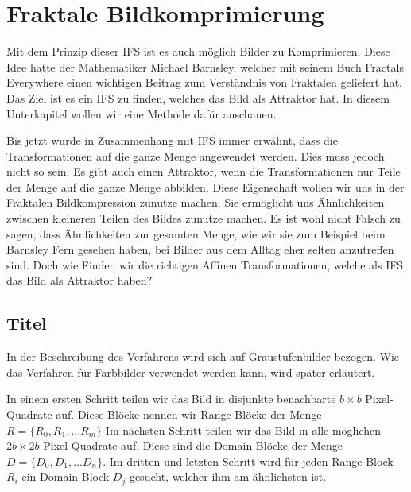 %
%
%
\section{Fraktale Bildkomprimierung
\label{ifs:section:teil3}}
Mit dem Prinzip dieser IFS ist es auch möglich Bilder zu Komprimieren.
Diese Idee hatte der Mathematiker Michael Barnsley, welcher mit seinem Buch Fractals Everywhere einen wichtigen Beitrag zum Verständnis von Fraktalen geliefert hat.
Das Ziel ist es ein IFS zu finden, welches das Bild als Attraktor hat.
In diesem Unterkapitel wollen wir eine Methode dafür anschauen.


Bis jetzt wurde in Zusammenhang mit IFS immer erwähnt, dass die Transformationen auf die ganze Menge angewendet werden.
Dies muss jedoch nicht so sein. 
Es gibt auch einen Attraktor, wenn die Transformationen nur Teile der Menge auf die ganze Menge abbilden.
Diese Eigenschaft wollen wir uns in der Fraktalen Bildkompression zunutze machen.
Sie ermöglicht uns Ähnlichkeiten zwischen kleineren Teilen des Bildes zunutze machen.
Es ist wohl nicht Falsch zu sagen, dass Ähnlichkeiten zur gesamten Menge, wie wir sie zum Beispiel beim Barnsley Fern gesehen haben, bei Bilder aus dem Alltag eher selten anzutreffen sind.
Doch wie Finden wir die richtigen Affinen Transformationen, welche als IFS das Bild als Attraktor haben?

\subsection{Titel
\label{ifs:subsection:malorum}}
In der Beschreibung des Verfahrens wird sich auf Graustufenbilder bezogen. Wie das Verfahren für Farbbilder verwendet werden kann, wird später erläutert.

In einem ersten Schritt teilen wir das Bild in disjunkte benachbarte $b \times b$ Pixel-Quadrate auf. Diese Blöcke nennen wir Range-Blöcke der Menge $R=\{R_0,R_1,...R_m\}$
Im nächsten Schritt teilen wir das Bild in alle möglichen $2b \times 2b$ Pixel-Quadrate auf. Diese sind die Domain-Blöcke der Menge $D = \{D_0,D_1,...D_n\}$. 
Im dritten und letzten Schritt wird für jeden Range-Block $R_i$ ein Domain-Block $D_j$ gesucht, welcher ihm am ähnlichsten ist.

